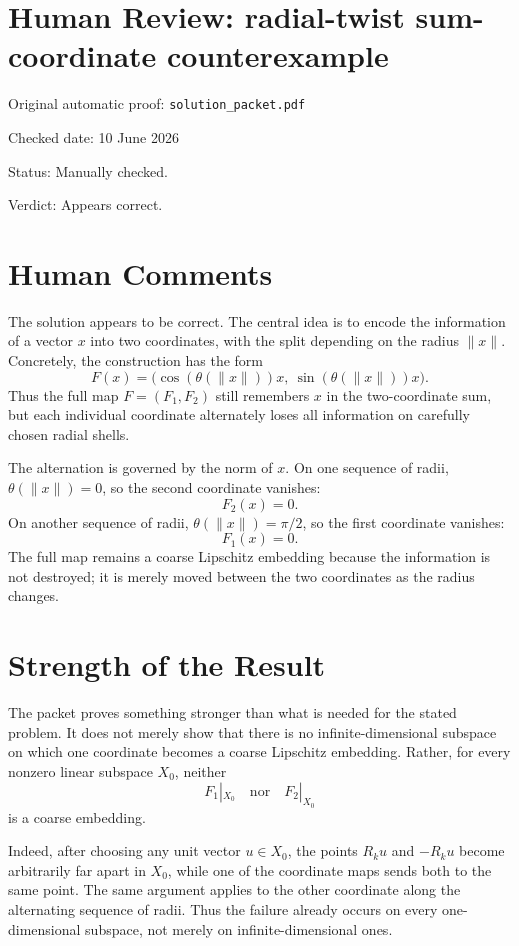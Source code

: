 \documentclass[11pt]{article}
\begin{document}
\section*{Human Review: radial-twist sum-coordinate counterexample}

\noindent Original automatic proof: \texttt{solution\_packet.pdf}

\noindent Checked date: 10 June 2026

\noindent Status: Manually checked.

\noindent Verdict: Appears correct.

\section*{Human Comments}

The solution appears to be correct. The central idea is to encode the
information of a vector \(x\) into two coordinates, with the split depending
on the radius \(\|x\|\). Concretely, the construction has the form
\[
  F(x)=\bigl(\cos(\theta(\|x\|))x,\ \sin(\theta(\|x\|))x\bigr).
\]
Thus the full map \(F=(F_1,F_2)\) still remembers \(x\) in the
two-coordinate sum, but each individual coordinate alternately loses all
information on carefully chosen radial shells.

The alternation is governed by the norm of \(x\). On one sequence of radii,
\(\theta(\|x\|)=0\), so the second coordinate vanishes:
\[
  F_2(x)=0.
\]
On another sequence of radii, \(\theta(\|x\|)=\pi/2\), so the first
coordinate vanishes:
\[
  F_1(x)=0.
\]
The full map remains a coarse Lipschitz embedding because the information is
not destroyed; it is merely moved between the two coordinates as the radius
changes.

\section*{Strength of the Result}

The packet proves something stronger than what is needed for the stated
problem. It does not merely show that there is no infinite-dimensional
subspace on which one coordinate becomes a coarse Lipschitz embedding.
Rather, for every nonzero linear subspace \(X_0\), neither
\[
  F_1|_{X_0}\quad\text{nor}\quad F_2|_{X_0}
\]
is a coarse embedding.

Indeed, after choosing any unit vector \(u\in X_0\), the points \(R_k u\) and
\(-R_k u\) become arbitrarily far apart in \(X_0\), while one of the
coordinate maps sends both to the same point. The same argument applies to
the other coordinate along the alternating sequence of radii. Thus the
failure already occurs on every one-dimensional subspace, not merely on
infinite-dimensional ones.
\end{document}
